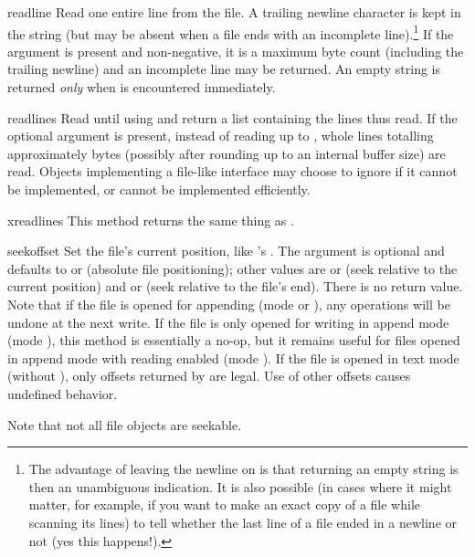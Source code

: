 \begin{methoddesc}[file]{readline}{}
  Read one entire line from the file.  A trailing newline character is
  kept in the string (but may be absent when a file ends with an
  incomplete line).\footnote{
	The advantage of leaving the newline on is that
	returning an empty string is then an unambiguous \EOF{}
	indication.  It is also possible (in cases where it might
	matter, for example, if you
	want to make an exact copy of a file while scanning its lines)
	to tell whether the last line of a file ended in a newline
	or not (yes this happens!).
  }  If the  argument is present and
  non-negative, it is a maximum byte count (including the trailing
  newline) and an incomplete line may be returned.
  An empty string is returned \emph{only} when \EOF{} is encountered
  immediately.  
\end{methoddesc}

\begin{methoddesc}[file]{readlines}{}
  Read until \EOF{} using  and return a list containing
  the lines thus read.  If the optional  argument is
  present, instead of reading up to \EOF, whole lines totalling
  approximately  bytes (possibly after rounding up to an
  internal buffer size) are read.  Objects implementing a file-like
  interface may choose to ignore  if it cannot be
  implemented, or cannot be implemented efficiently.
\end{methoddesc}

\begin{methoddesc}[file]{xreadlines}{}
  This method returns the same thing as .
\end{methoddesc}

\begin{methoddesc}[file]{seek}{offset}
  Set the file's current position, like 's .
  The  argument is optional and defaults to 
   or 
  (absolute file positioning); other values are  or 
  (seek
  relative to the current position) and  or  
  (seek relative to the
  file's end).  There is no return value.  Note that if the file is
  opened for appending (mode  or ), any
   operations will be undone at the next write.  If the
  file is only opened for writing in append mode (mode ),
  this method is essentially a no-op, but it remains useful for files
  opened in append mode with reading enabled (mode ).  If the
  file is opened in text mode (without ), only offsets returned
  by  are legal.  Use of other offsets causes undefined
  behavior.

  Note that not all file objects are seekable.
\end{methoddesc}


